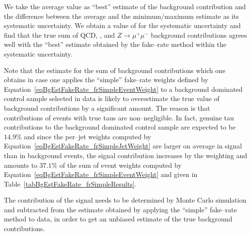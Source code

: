 We take the average value as ``best'' estimate of the background contribution
and the difference between the average and the minimum/maximum estimate as its
systematic uncertainty.  We obtain a value of 
for the systematic uncertainty and find that the true sum of QCD, \WpJets,
\ttbarpJets and $Z \rightarrow \mu^{+} \mu^{-}$ background contributions
agrees well with the ``best'' estimate obtained by the fake--rate method within
the systematic uncertainty.

Note that the estimate for the sum of background contributions which one obtains
in case one applies the ``simple'' fake--rate weights defined by
Equation~\ref{eqBgEstFakeRate_frSimpleEventWeight} to a background dominated
control sample selected in data is likely to overestimate the true value of
background contributions by a significant amount.  The reason is that
contributions of \ZTT events with true taus are non--negligible.  In fact,
genuine tau contributions to the background dominated control sample are
expected to be $14.9 \%$ and since the per--jet weights computed by
Equation~\ref{eqBgEstFakeRate_frSimpleJetWeight} are larger on average in signal
than in background events, the signal contribution increases by the weighting
and amounts to $37.1 \%$ of the sum of event weights computed by
Equation~\ref{eqBgEstFakeRate_frSimpleEventWeight} and given in
Table~\ref{tabBgEstFakeRate_frSimpleResults}.

The contribution of the \ZTT signal needs to be
determined by Monte Carlo simulation and subtracted from the estimate obtained
by applying the ``simple'' fake--rate method to data, in order to get an
unbiased estimate of the true background contributions.

